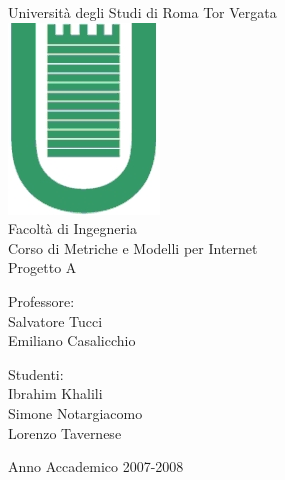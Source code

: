 \begin{titlepage}
\begin{center}
\LARGE{Università degli Studi di Roma Tor Vergata}\\
\vspace{10mm}
\includegraphics[scale=0.50]{etc/logo.jpg}\\
Facoltà di Ingegneria\\
\vspace{5mm}
\normalsize{Corso di Metriche e Modelli per Internet}\\
\vspace{20mm}
\large{Progetto A}\\
\end{center}
\vspace{40mm}
\begin{minipage}[t]{0.30\textwidth}
\begin{center}
{\normalsize{Professore:\\
Salvatore Tucci\\
Emiliano Casalicchio}}
\end{center}
\end{minipage}
\hfill
\begin{minipage}[t]{0.30\textwidth}
\begin{center}
{\normalsize{Studenti:\\
Ibrahim Khalili\\
Simone Notargiacomo\\
Lorenzo Tavernese}}
\end{center}
\end{minipage}
\vspace{10mm}
\begin{center}
Anno Accademico 2007-2008
\end{center}

\end{titlepage}